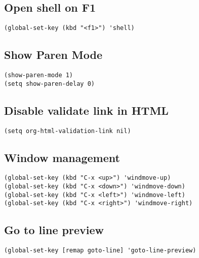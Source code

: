 \documentclass[11pt]{article}
\begin{document}
\subsection{Open shell on F1}
\label{sec:orgd7387ae}
\begin{verbatim}
(global-set-key (kbd "<f1>") 'shell)
\end{verbatim}
\subsection{Show Paren Mode}
\label{sec:org0667ddf}
\begin{verbatim}
(show-paren-mode 1)
(setq show-paren-delay 0)
\end{verbatim}
\subsection{Disable validate link in HTML}
\label{sec:orgccf8d42}
\begin{verbatim}
(setq org-html-validation-link nil)
\end{verbatim}
\subsection{Window management}
\label{sec:org2f15afe}
\begin{verbatim}
(global-set-key (kbd "C-x <up>") 'windmove-up)
(global-set-key (kbd "C-x <down>") 'windmove-down)
(global-set-key (kbd "C-x <left>") 'windmove-left)
(global-set-key (kbd "C-x <right>") 'windmove-right)
\end{verbatim}
\subsection{Go to line preview}
\label{sec:org44894e9}
\begin{verbatim}
(global-set-key [remap goto-line] 'goto-line-preview)
\end{verbatim}
\end{document}
